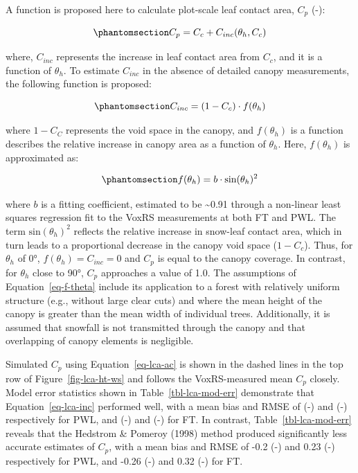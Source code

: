 \documentclass[
  letterpaper,
  DIV=11,
  numbers=noendperiod]{scrartcl}
\begin{document}
A function is proposed here to calculate plot-scale leaf contact area,
\(C_p\) (-):

\begin{equation}\phantomsection\label{eq-lca-ac}{
C_p = C_c + C_{inc}(\theta_h, C_c)
}\end{equation}

where, \(C_{inc}\) represents the increase in leaf contact area from
\(C_c\), and it is a function of \(\theta_h\). To estimate \(C_{inc}\)
in the absence of detailed canopy measurements, the following function
is proposed:

\begin{equation}\phantomsection\label{eq-lca-inc}{
C_{inc} = (1-C_c)\cdot f(\theta_h)
}\end{equation}

where \(1-C_C\) represents the void space in the canopy, and
\(f(\theta_h)\) is a function describes the relative increase in canopy
area as a function of \(\theta_h\). Here, \(f(\theta_h)\) is
approximated as:

\begin{equation}\phantomsection\label{eq-f-theta}{
f(\theta_h) = b \cdot\text{sin}(\theta_h)^2
}\end{equation}

where \(b\) is a fitting coefficient, estimated to be
\textasciitilde0.91 through a non-linear least squares regression fit to
the VoxRS measurements at both FT and PWL. The term
\(\text{sin}(\theta_h)^2\) reflects the relative increase in snow-leaf
contact area, which in turn leads to a proportional decrease in the
canopy void space (\(1-C_c\)). Thus, for \(\theta_h\) of 0°,
\(f(\theta_h) = C_{inc} = 0\) and \(C_p\) is equal to the canopy
coverage. In contrast, for \(\theta_h\) close to 90°, \(C_p\) approaches
a value of 1.0. The assumptions of Equation~\ref{eq-f-theta} include its
application to a forest with relatively uniform structure (e.g., without
large clear cuts) and where the mean height of the canopy is greater
than the mean width of individual trees. Additionally, it is assumed
that snowfall is not transmitted through the canopy and that overlapping
of canopy elements is negligible.

Simulated \(C_p\) using Equation~\ref{eq-lca-ac} is shown in the dashed
lines in the top row of Figure~\ref{fig-lca-ht-ws} and follows the
VoxRS-measured mean \(C_p\) closely. Model error statistics shown in
Table~\ref{tbl-lca-mod-err} demonstrate that Equation~\ref{eq-lca-inc}
performed well, with a mean bias and RMSE of (-) and (-) respectively
for PWL, and (-) and (-) for FT. In contrast,
Table~\ref{tbl-lca-mod-err} reveals that the Hedstrom \& Pomeroy (1998)
method produced significantly less accurate estimates of \(C_p\), with a
mean bias and RMSE of -0.2 (-) and 0.23 (-) respectively for PWL, and
-0.26 (-) and 0.32 (-) for FT.
\end{document}
